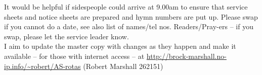 \documentclass[10pt]{article}
\begin{document}
\begin{minipage}{0.65\textwidth}
{\footnotesize It would be helpful if sidespeople 
could arrive at 9.00am to ensure that service sheets and notice sheets are 
prepared and hymn numbers are put up.
Please swap if you cannot do a date, see also list of names/tel nos.
Readers/Pray-ers -- if you swap, please let the service leader know.\\
I aim to update the master copy with changes as they
happen and make it available -- for those with internet access
\linebreak -- at
\url{http://brock-marshall.no-ip.info/~robert/AS-rotas}
(Robert Marshall 262151)}
\end{minipage}
\hspace{1.5em}
\begin{minipage}{0.3\textwidth}
\ifpdf
\else
\hspace{0.5em}
\fi
\end{minipage}
\end{document}
